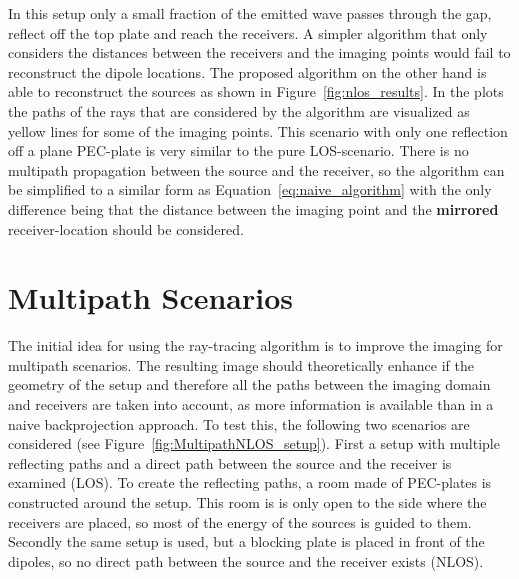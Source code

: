 In this setup only a small fraction of the emitted wave passes through the gap, reflect off the top plate and reach the receivers.
A simpler algorithm that only considers the distances between the receivers and the imaging points would fail to reconstruct the dipole locations.
The proposed algorithm on the other hand is able to reconstruct the sources as shown in Figure~\ref{fig:nlos_results}.
In the plots the paths of the rays that are considered by the algorithm are visualized as yellow lines for some of the imaging points.
This scenario with only one reflection off a plane PEC-plate is very similar to the pure LOS-scenario.
There is no multipath propagation between the source and the receiver, so the algorithm can be simplified to a similar form as Equation~\eqref{eq:naive_algorithm} with the only difference being that the distance between the imaging point and the \textbf{mirrored} receiver-location should be considered.



\section{Multipath Scenarios}
The initial idea for using the ray-tracing algorithm is to improve the imaging for multipath scenarios.
The resulting image should theoretically enhance if the geometry of the setup and therefore all the paths between the imaging domain and receivers are taken into account, as more information is available than in a naive backprojection approach.
To test this, the following two scenarios are considered (see Figure~\ref{fig:MultipathNLOS_setup}).
First a setup with multiple reflecting paths and a direct path between the source and the receiver is examined (LOS).
To create the reflecting paths, a room made of PEC-plates is constructed around the setup.
This room is is only open to the side where the receivers are placed, so most of the energy of the sources is guided to them.
Secondly the same setup is used, but a blocking plate is placed in front of the dipoles, so no direct path between the source and the receiver exists (NLOS).


